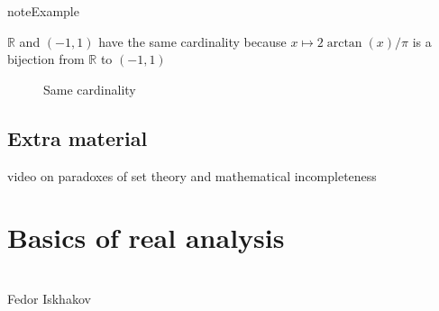 \documentclass[letterpaper,10pt,english]{jupyterBook}
\begin{document}
\begin{sphinxadmonition}{note}{Example}

\sphinxAtStartPar
\(\mathbb{R}\) and \((-1, 1)\) have the same cardinality because \(x \mapsto 2\arctan(x)/\pi\) is a bijection from \(\mathbb{R}\) to \((-1, 1)\)
\end{sphinxadmonition}

\begin{figure}[htbp]
\centering
\capstart

\noindent{}
\caption{Same cardinality}\label{\detokenize{03.set_theory:arctan}}\end{figure}


\section{Extra material}
\label{\detokenize{03.set_theory:extra-material}}
\sphinxAtStartPar
{} video on paradoxes of set theory and mathematical incompleteness 

\sphinxstepscope


\chapter{Basics of real analysis}
\label{\detokenize{04.basic_analysis:basics-of-real-analysis}}\label{\detokenize{04.basic_analysis::doc}}
\sphinxAtStartPar
{}\\
Fedor Iskhakov
\end{document}
